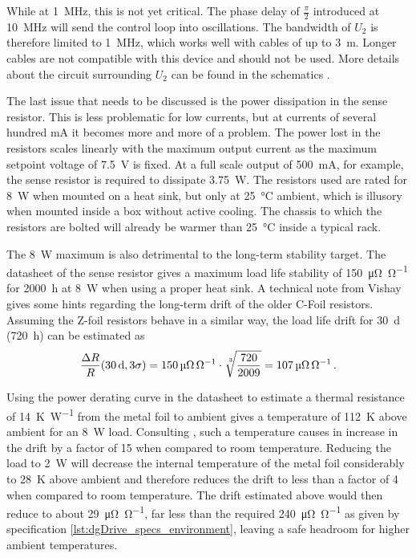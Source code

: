 While at \qty{1}{\MHz}, this is not yet critical. The phase delay of $\frac{\pi}{2}$ introduced at \qty{10}{\MHz} will send the control loop into oscillations. The bandwidth of $U_2$ is therefore limited to \qty{1}{\MHz}, which works well with cables of up to \qty{3}{\m}. Longer cables are not compatible with this device and should not be used. More details about the circuit surrounding $U_2$ can be found in the schematics \cite{git_dgDrive}.

The last issue that needs to be discussed is the power dissipation in the sense resistor. This is less problematic for low currents, but at currents of several hundred \unit{\mA} it becomes more and more of a problem. The power lost in the resistors scales linearly with the maximum output current as the maximum setpoint voltage of \qty{7.5}{\V} is fixed. At a full scale output of \qty{500}{\mA}, for example, the sense resistor is required to dissipate \qty{3.75}{\W}. The resistors used are rated for \qty{8}{\W} when mounted on a heat sink, but only at \qty{25}{\celsius} ambient, which is illusory when mounted inside a box without active cooling. The chassis to which the resistors are bolted will already be warmer than \qty{25}{\celsius} inside a typical rack.

The \qty{8}{\W} maximum is also detrimental to the long-term stability target. The datasheet of the sense resistor gives a maximum load life stability of \qty{150}{\micro \ohm \per \ohm} for \qty{2000}{\hour} at \qty{8}{\W} \cite{datasheet_VPR}  when using a proper heat sink. A technical note from Vishay \cite{ResistorDrift} gives some hints regarding the long-term drift of the older C-Foil resistors. Assuming the Z-foil  resistors behave in a similar way, the load life drift for \qty{30}{\day} (\qty{720}{\hour}) can be estimated as
\begin{equation*}
    \frac{\Delta R}{R}(\qty{30}{\day}, 3\sigma) = \qty{150}{\micro \ohm \per \ohm} \cdot \sqrt[\leftroot{-2}\uproot{2}3]{\frac{720}{2009}} = \qty{107}{\micro \ohm \per \ohm}\,.
\end{equation*}

Using the power derating curve in the datasheet \cite{datasheet_VPR} to estimate a thermal resistance of \qty{14}{\K \per \W} from the metal foil to ambient gives a temperature of \qty{112}{\K} above ambient for an \qty{8}{\W} load. Consulting \cite{ResistorDrift}, such a temperature causes in increase in the drift by a factor of \num{15} when compared to room temperature. Reducing the load to \qty{2}{\W} will decrease the internal temperature of the metal foil considerably to \qty{28}{\K} above ambient and therefore reduces the drift to less than a factor of \num{4} when compared to room temperature. The drift estimated above would then reduce to about \qty{29}{\micro \ohm \per \ohm}, far less than the required \qty{240}{\micro \ohm \per \ohm} as given by specification \ref{lst:dgDrive_specs_environment}, leaving a safe headroom for higher ambient temperatures.

